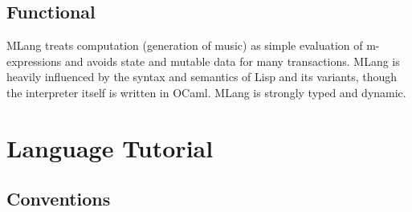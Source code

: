 \documentclass[letterpaper,11pt]{article}
\begin{document}
\subsection{Functional}
MLang treats computation (generation of music) as simple evaluation of m-expressions and avoids state and mutable data for many transactions. MLang is heavily influenced by the syntax and semantics of Lisp and its variants, though the interpreter itself is written in OCaml. MLang is strongly typed and dynamic.


\section{Language Tutorial}

\subsection{Conventions}
\end{document}
